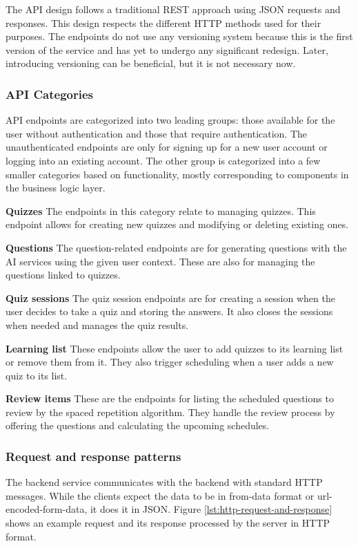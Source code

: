 The API design follows a traditional REST approach using JSON requests and responses. This design respects the different HTTP methods used for their purposes. The endpoints do not use any versioning system because this is the first version of the service and has yet to undergo any significant redesign. Later, introducing versioning can be beneficial, but it is not necessary now.

\subsubsection{API Categories}

API endpoints are categorized into two leading groups: those available for the user without authentication and those that require authentication. The unauthenticated endpoints are only for signing up for a new user account or logging into an existing account. The other group is categorized into a few smaller categories based on functionality, mostly corresponding to components in the business logic layer.

\textbf{Quizzes} The endpoints in this category relate to managing quizzes. This endpoint allows for creating new quizzes and modifying or deleting existing ones.

\textbf{Questions} The question-related endpoints are for generating questions with the AI services using the given user context. These are also for managing the questions linked to quizzes.

\textbf{Quiz sessions} The quiz session endpoints are for creating a session when the user decides to take a quiz and storing the answers. It also closes the sessions when needed and manages the quiz results.

\textbf{Learning list} These endpoints allow the user to add quizzes to its learning list or remove them from it. They also trigger scheduling when a user adds a new quiz to its list.

\textbf{Review items} These are the endpoints for listing the scheduled questions to review by the spaced repetition algorithm. They handle the review process by offering the questions and calculating the upcoming schedules.

\subsubsection{Request and response patterns}

The backend service communicates with the backend with standard HTTP messages. While the clients expect the data to be in from-data format or url-encoded-form-data, it does it in JSON. Figure \ref{lst:http-request-and-response} shows an example request and its response processed by the server in HTTP format.

